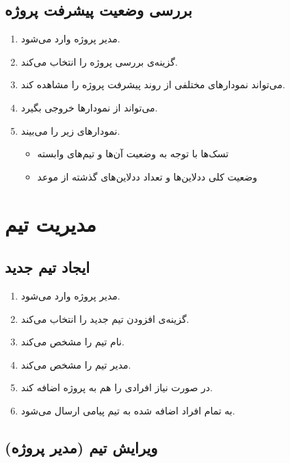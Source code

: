 \documentclass[10pt,a4paper]{article}
\begin{document}
\subsection{
بررسی وضعیت پیشرفت پروژه
}


\begin{enumerate}
	\item 
	مدیر پروژه وارد می‌شود.
	\item
	گزینه‌ی بررسی پروژه را انتخاب می‌کند.
	\item
	می‌تواند نمودار‌های مختلفی از روند پیشرفت پروژه را مشاهده کند.
	\item
	می‌تواند از نمودار‌ها خروجی بگیرد.
	\item
	نمودارهای زیر را می‌بیند.
		 \begin{itemize}
		\item 
		تسک‌ها با توجه به وضعیت آن‌ها و تیم‌های وابسته
		\item
		وضعیت کلی ددلاین‌ها و تعداد ددلاین‌های گذشته از موعد
	\end{itemize}
	
\end{enumerate}


\section{
مدیریت تیم
}

\subsection{
ایجاد تیم جدید
}
\begin{enumerate}
	\item 
	مدیر پروژه وارد می‌شود.
	\item
	گزینه‌ی افزودن تیم جدید را انتخاب می‌کند.
	\item
	نام تیم را مشخص می‌کند.
	\item
	مدیر تیم را مشخص می‌کند.
	\item
	در صورت نیاز افرادی را هم به پروژه اضافه کند.
	\item
	به تمام افراد اضافه شده به تیم پیامی ارسال می‌شود.
\end{enumerate}

\subsection{
	ویرایش تیم (مدیر پروژه)
}
\end{document}
